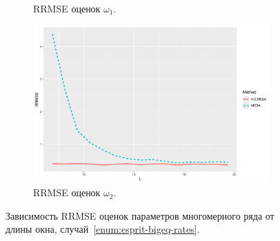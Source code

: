 \documentclass[specialist,
  substylefile=spbu.rtx,
subf,href,colorlinks=true, 12pt]{disser}
\theoremstyle{plain}
\theoremstyle{definition}
\theoremstyle{remark}
\begin{document}
\begin{figure}[!ht]
\begin{subfigure}{0.49\linewidth}
    \caption{RRMSE оценок $\omega_1$.}
    \label{fig:freq1_L_large_eq_rates}
  \end{subfigure}
  \begin{subfigure}{0.49\linewidth}
    \includegraphics[width=\linewidth]{freq2_L_large_eq_rates.pdf}
    \caption{RRMSE оценок $\omega_2$.}
    \label{fig:freq2_L_large_eq_rates}
  \end{subfigure}
  \caption{Зависимость RRMSE оценок параметров многомерного ряда от длины окна,
  случай~\ref{enum:esprit-bigeq-rates}.}
  \label{fig:L_large_eq_rates}
\end{figure}
\end{document}
